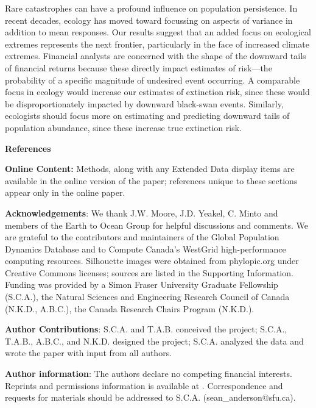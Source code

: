 Rare catastrophes can have a profound influence on population persistence\cite{mangel1994}. In recent decades, ecology has moved toward focussing on aspects of variance in addition to mean responses\cite{loreau2010a, thompson2013}. Our results suggest that an added focus on ecological extremes represents the next frontier, particularly in the face of increased climate extremes\cite{meehl2004, ipcc2012, thompson2013}. Financial analysts are concerned with the shape of the downward tails of financial returns because these directly impact estimates of risk---the probability of a specific magnitude of undesired event occurring\cite{rachev2008}. A comparable focus in ecology would increase our estimates of extinction risk, since these would be disproportionately impacted by downward black-swan events. Similarly, ecologists should focus more on estimating and predicting downward tails of population abundance, since these increase true extinction risk.

\textbf{References}

\renewcommand{\section}[2]{}%



\textbf{Online Content:} Methods, along with any Extended Data display items are available in the online version of the paper; references unique to these sections appear only in the online paper.

\textbf{Acknowledgements}: We thank J.W. Moore, J.D. Yeakel, C. Minto and members of the Earth to Ocean Group for helpful discussions and comments. We are grateful to the contributors and maintainers of the Global Population Dynamics Database and to Compute Canada's WestGrid high-performance computing resources. Silhouette images were obtained from phylopic.org under Creative Commons licenses; sources are listed in the Supporting Information. Funding was provided by a Simon Fraser University Graduate Fellowship (S.C.A.), the Natural Sciences and Engineering Research Council of Canada (N.K.D., A.B.C.), the Canada Research Chairs Program (N.K.D.).

\textbf{Author Contributions}: S.C.A. and T.A.B. conceived the project; S.C.A., T.A.B., A.B.C., and N.K.D. designed the project; S.C.A. analyzed the data and wrote the paper with input from all authors.

\textbf{Author information}: The authors declare no competing financial interests. Reprints and permissions information is available at . Correspondence and requests for materials should be addressed to S.C.A. (sean\_anderson@sfu.ca).

